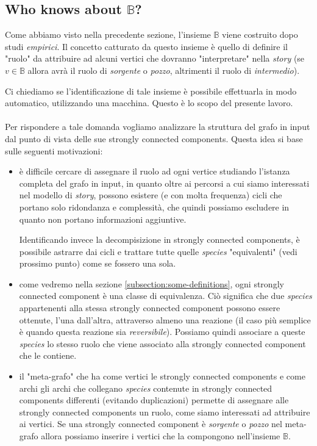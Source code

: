 \subsection{Who knows about $\mathbb{B}$?}
Come abbiamo visto nella precedente sezione, l'insieme $\mathbb{B}$
viene costruito dopo studi \emph{empirici}. Il concetto catturato da
questo insieme \`e quello di definire il "ruolo" da attribuire ad
alcuni vertici che dovranno "interpretare" nella \emph{story} (se $v
\in \mathbb{B}$ allora avr\`a il ruolo di \emph{sorgente} o
\emph{pozzo}, altrimenti il ruolo di \emph{intermedio}).

Ci chiediamo se l'identificazione di tale insieme \`e possibile
effettuarla in modo automatico, utilizzando una macchina. Questo \`e
lo scopo del presente lavoro.
\\\\
Per rispondere a tale domanda vogliamo analizzare la struttura del
grafo in input dal punto di vista delle sue strongly connected
components. Questa idea si base sulle seguenti motivazioni:
\begin{itemize}
\item \`e difficile cercare di assegnare il ruolo ad ogni vertice
  studiando l'istanza completa del grafo in input, in quanto oltre ai
  percorsi a cui siamo interessati nel modello di \emph{story},
  possono esistere (e con molta frequenza) cicli che portano solo
  ridondanza e complessit\`a, che quindi possiamo escludere in quanto
  non portano informazioni aggiuntive. 

  Identificando invece la decompisizione in strongly connected
  components, \`e possibile astrarre dai cicli e trattare tutte quelle
  \emph{species} "equivalenti" (vedi prossimo punto) come se fossero
  una sola.
\item come vedremo nella sezione \ref{subsection:some-definitions},
  ogni strongly connected component \`e una classe di
  equivalenza. Ci\`o significa che due \emph{species} appartenenti
  alla stessa strongly connected component possono essere ottenute,
  l'una dall'altra, attraverso almeno una reazione (il caso pi\`u
  semplice \`e quando questa reazione sia
  \emph{reversibile}). Possiamo quindi associare a queste
  \emph{species} lo stesso ruolo che viene associato alla strongly
  connected component che le contiene.
\item il "meta-grafo" che ha come vertici le strongly connected
  components e come archi gli archi che collegano \emph{species}
  contenute in strongly connected components differenti (evitando
  duplicazioni) permette di assegnare alle strongly connected
  components un ruolo, come siamo interessati ad attribuire ai
  vertici. Se una strongly connected component \`e \emph{sorgente} o
  \emph{pozzo} nel meta-grafo allora possiamo inserire i vertici che
  la compongono nell'insieme $\mathbb{B}$.
\end{itemize}
